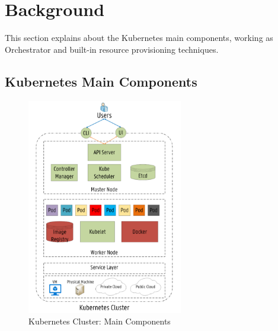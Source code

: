 \section{Background}
\label{sec:backgroud}
This section explains about the Kubernetes main components, working as Orchestrator and built-in resource provisioning techniques.
\subsection{Kubernetes Main Components}
\label{sec:k8s_main_comp}

\begin{figure}
  \centering
  \includegraphics[width=68mm]{figures/mlcn-k8s-components.pdf}
  \caption{Kubernetes Cluster: Main Components\cite{Santos2019}}
  \label{fig:k8s-comp}
\end{figure}
